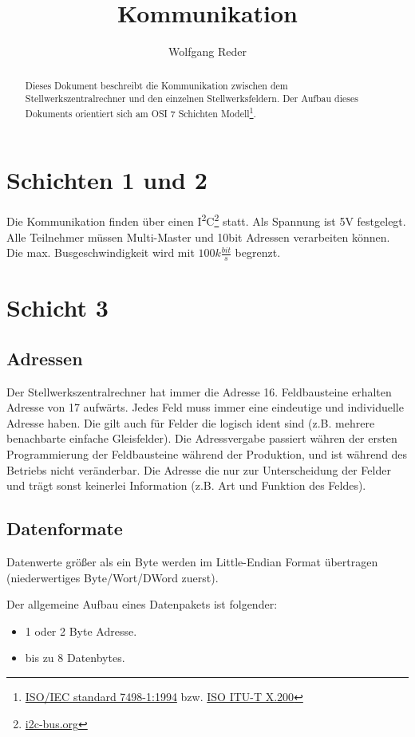 \documentclass[10pt,a4paper]{article}
\author{Wolfgang Reder}
\title{Kommunikation}
\begin{document}
\maketitle
\begin{abstract}
Dieses Dokument beschreibt die Kommunikation zwischen dem Stellwerkszentralrechner und den
einzelnen Stellwerksfeldern. Der Aufbau dieses Dokuments orientiert sich am OSI 7 Schichten Modell\footnote{\href{http://standards.iso.org/ittf/PubliclyAvailableStandards/s020269_ISO_IEC_7498-1_1994(E).zip}{ISO/IEC standard 7498-1:1994} bzw. \href{http://www.itu.int/rec/dologin_pub.asp?lang=e&id=T-REC-X.200-199407-I!!PDF-E&type=items}{ISO ITU-T X.200}}.
\end{abstract}
\tableofcontents
\newpage
\section{Schichten 1 und 2}
Die Kommunikation finden über einen I\textsuperscript{2}C\footnote{\href{https://www.i2c-bus.org/}{i2c-bus.org}} statt. Als Spannung ist 5V festgelegt. Alle Teilnehmer müssen Multi-Master und 10bit Adressen verarbeiten können. Die max. Busgeschwindigkeit wird mit $100k\frac{bit}{s}$ begrenzt.

\section{Schicht 3}
\subsection{Adressen}
Der Stellwerkszentralrechner hat immer die Adresse 16. Feldbausteine erhalten Adresse von 17 aufwärts. Jedes Feld muss immer eine eindeutige und individuelle Adresse haben. Die gilt auch für Felder die logisch ident sind (z.B. mehrere benachbarte einfache Gleisfelder). Die Adressvergabe passiert währen der ersten Programmierung der Feldbausteine während der Produktion, und ist während des Betriebs nicht veränderbar. Die Adresse die nur zur Unterscheidung der Felder und trägt sonst keinerlei Information (z.B. Art und Funktion des Feldes).
\subsection{Datenformate}
Datenwerte größer als ein Byte werden im Little-Endian Format übertragen (niederwertiges Byte/Wort/DWord zuerst).

Der allgemeine Aufbau eines Datenpakets ist folgender:
\begin{itemize}
\item 1 oder 2 Byte Adresse.
\item bis zu 8 Datenbytes.
\end{itemize}
\end{document}
